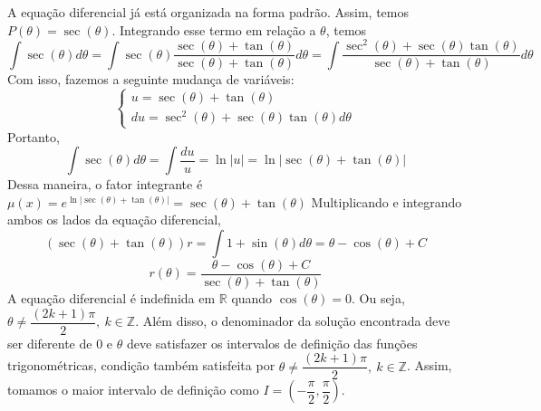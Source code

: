 \documentclass[oneside,12pt,a4paper]{report}
\begin{document}
\begin{resolucao}
        \itemresolucao A equação diferencial já está organizada na forma padrão. Assim, temos $P(\theta)=\sec(\theta)$. Integrando esse termo em relação a $\theta$, temos
        \[\int \sec(\theta)d\theta=\int\sec(\theta)\frac{\sec(\theta)+\tan(\theta)}{\sec(\theta)+\tan(\theta)}d\theta=\int\frac{\sec^2(\theta)+\sec(\theta)\tan(\theta)}{\sec(\theta)+\tan(\theta)}d\theta\]
        Com isso, fazemos a seguinte mudança de variáveis: 
        \[\begin{cases}
            u=\sec(\theta)+\tan(\theta)\\
            du=\sec^2(\theta)+\sec(\theta)\tan(\theta)d\theta
        \end{cases}\]
        Portanto,
        \[\int \sec(\theta)d\theta=\int\frac{du}{u}=\ln|u|=\ln|\sec(\theta)+\tan(\theta)|\]
        Dessa maneira, o fator integrante é $\mu(x)=e^{\ln|\sec(\theta)+\tan(\theta)|}=\sec(\theta)+\tan(\theta)$
        Multiplicando e integrando ambos os lados da equação diferencial,
        \[(\sec(\theta)+\tan(\theta))r=\int 1+\sin(\theta)d\theta=\theta-\cos(\theta)+C\]
        \[\boxed{r(\theta)=\frac{\theta-\cos(\theta)+C}{\sec(\theta)+\tan(\theta)}}\]
        A equação diferencial é indefinida em $\mathbb{R}$ quando $\cos(\theta)=0$. Ou seja, $\theta\neq\dfrac{(2k+1)\pi}{2},~k\in\mathbb{Z}$. Além disso, o denominador da solução encontrada deve ser diferente de $0$ e $\theta$ deve satisfazer os intervalos de definição das funções trigonométricas, condição também satisfeita por $\theta\neq\dfrac{(2k+1)\pi}{2},~k\in\mathbb{Z}$. Assim, tomamos o maior intervalo de definição como $I=\left(-\dfrac{\pi}{2}, \dfrac{\pi}{2}\right)$.
    \end{resolucao}
\end{document}
